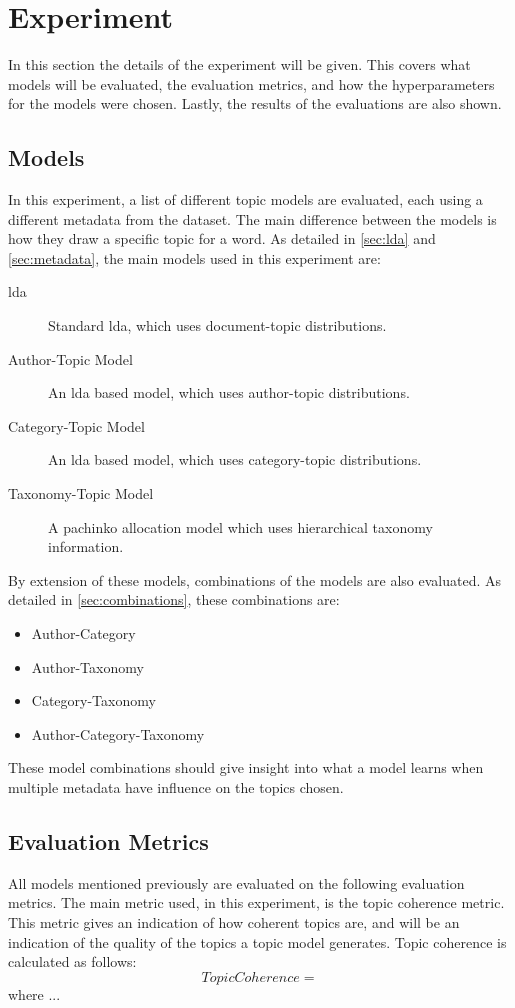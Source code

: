 \section{Experiment}\label{sec:experiment}
In this section the details of the experiment will be given.
This covers what models will be evaluated, the evaluation metrics, and how the hyperparameters for the models were chosen.
Lastly, the results of the evaluations are also shown.

\subsection{Models}\label{sec:experiment_models}
In this experiment, a list of different topic models are evaluated, each using a different metadata from the dataset.
The main difference between the models is how they draw a specific topic for a word.
As detailed in \autoref{sec:lda} and \autoref{sec:metadata}, the main models used in this experiment are:
\begin{description}
	\item[\Acrlong{lda}] Standard \gls{lda}, which uses document-topic distributions.
	\item[Author-Topic Model] An \gls{lda} based model, which uses author-topic distributions.
	\item[Category-Topic Model] An \gls{lda} based model, which uses category-topic distributions.
	\item[Taxonomy-Topic Model] A pachinko allocation model which uses hierarchical taxonomy information.
\end{description}

By extension of these models, combinations of the models are also evaluated.
As detailed in \autoref{sec:combinations}, these combinations are:
\begin{itemize}
	\item Author-Category
	\item Author-Taxonomy
	\item Category-Taxonomy
	\item Author-Category-Taxonomy
\end{itemize}
These model combinations should give insight into what a model learns when multiple metadata have influence on the topics chosen.

\subsection{Evaluation Metrics}\label{sec:experiment_metrics}
All models mentioned previously are evaluated on the following evaluation metrics.
The main metric used, in this experiment, is the topic coherence metric.
This metric gives an indication of how coherent topics are, and will be an indication of the quality of the topics a topic model generates.
Topic coherence is calculated as follows:
\begin{equation}
	TopicCoherence = 
\end{equation}
\noindent where ...

